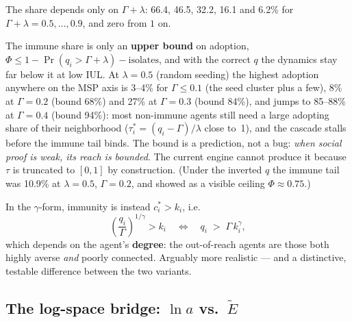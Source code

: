 \documentclass[11pt,a4paper]{article}
\newcommand{\Ee}{\tilde{E}}                 %
\begin{document}
\noindent The share depends only on $\Gamma + \lambda$: 66.4, 46.5, 32.2, 16.1 and 6.2\% for
$\Gamma + \lambda = 0.5, \dots, 0.9$, and zero from $1$ on.

The immune share is only an \textbf{upper bound} on adoption, $\Phi \le 1 - \Pr(q_i >
\Gamma + \lambda) - \text{isolates}$, and with the correct $q$ the dynamics stay far below
it at low IUL. At $\lambda = 0.5$ (random seeding) the highest adoption anywhere on the MSP
axis is 3--4\% for $\Gamma \le 0.1$ (the seed cluster plus a few), 8\% at $\Gamma = 0.2$
(bound 68\%) and 27\% at $\Gamma = 0.3$ (bound 84\%), and jumps to 85--88\% at
$\Gamma = 0.4$ (bound 94\%): most non-immune agents still need a large adopting share of
their neighborhood ($\tau_i^{*} = (q_i - \Gamma)/\lambda$ close to~1), and the cascade
stalls before the immune tail binds. The bound is a prediction, not a bug: \emph{when
social proof is weak, its reach is bounded}. The current engine cannot produce it because
$\tau$ is truncated to $[0,1]$ by construction. (Under the inverted $q$ the immune tail was
10.9\% at $\lambda = 0.5$, $\Gamma = 0.2$, and showed as a visible ceiling
$\Phi \approx 0.75$.)

In the $\gamma$-form, immunity is instead $c_i^{*} > k_i$, i.e.
\begin{equation}
  \left(\frac{q_i}{\Gamma}\right)^{1/\gamma} > k_i
  \quad\iff\quad
  q_i \;>\; \Gamma \, k_i^{\gamma},
\end{equation}
which depends on the agent's \textbf{degree}: the out-of-reach agents are those both
highly averse \emph{and} poorly connected. Arguably more realistic --- and a distinctive,
testable difference between the two variants.

\subsection{The log-space bridge: $\ln a$ vs.\ $\Ee$}
\label{sec:logbridge}
\end{document}
